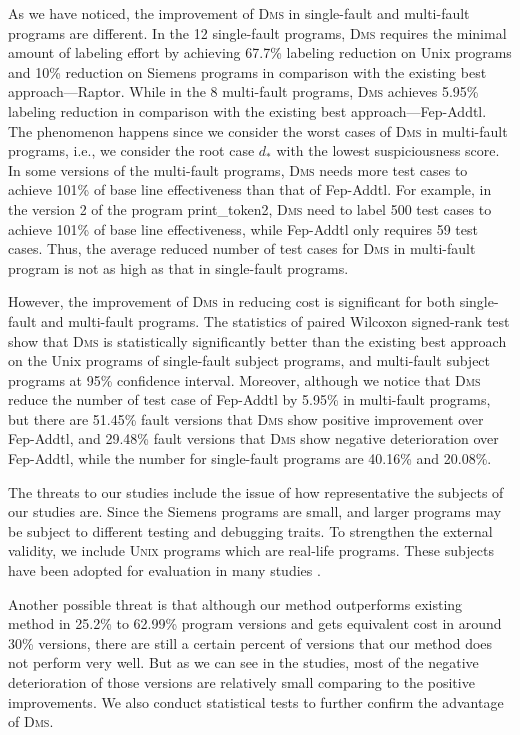 As we have noticed, the improvement of \textsc{Dms} in single-fault and multi-fault programs are different. In the 12 single-fault programs,  \textsc{Dms} requires the minimal amount of labeling effort by achieving 67.7\% labeling reduction on Unix programs and 10\% reduction on Siemens programs in comparison with the existing best approach---{\sc Raptor}. While in the 8 multi-fault programs, \textsc{Dms} achieves 5.95\% labeling reduction in comparison with the existing best approach---{\sc Fep-Addtl}. The phenomenon happens since we consider the worst cases of \textsc{Dms} in multi-fault programs, i.e., we consider the root case $d_*$ with the lowest suspiciousness score. In some versions of the multi-fault programs, \textsc{Dms} needs more test cases to achieve 101\% of base line effectiveness than that of {\sc Fep-Addtl}. For example, in the version 2 of the program print\_token2, \textsc{Dms} need to label 500 test cases to achieve 101\% of base line effectiveness, while {\sc Fep-Addtl} only requires 59 test cases. Thus, the average reduced number of test cases for \textsc{Dms} in multi-fault program is not as high as that in single-fault programs.

However, the improvement of \textsc{Dms} in reducing cost is significant for both single-fault and multi-fault programs. The statistics of  paired Wilcoxon signed-rank test show that \textsc{Dms} is statistically significantly better than the existing best approach on the Unix programs of single-fault subject programs, and multi-fault subject programs at 95\% confidence interval. Moreover, although we notice that \textsc{Dms} reduce the number of test case of Fep-Addtl by 5.95\% in multi-fault programs, but there are 51.45\% fault versions that \textsc{Dms} show positive improvement over Fep-Addtl, and  29.48\% fault versions that \textsc{Dms} show negative deterioration over Fep-Addtl, while the number for single-fault programs are 40.16\% and 20.08\%.


The threats to our studies include the issue of how
representative the subjects of our studies are. Since the Siemens programs
are small, and larger programs may be subject to different testing and debugging traits.
To strengthen the external validity, we include \textsc{Unix} programs which are
real-life programs. These subjects have been adopted for evaluation in many
studies \citep[e.g.][]{JH05,Abreu:2009.jss,DBLP:conf/icse/SantelicesJYH09}.

Another possible threat is that although our method outperforms existing method
in 25.2\% to 62.99\% program versions and gets equivalent cost in around 30\% versions,
there are still a certain percent of versions that our method does not perform very well.
But as we can see in the studies, most of the negative deterioration of those versions
are relatively small
comparing to the positive improvements. We also
conduct statistical tests to further confirm the advantage of \textsc{Dms}.

